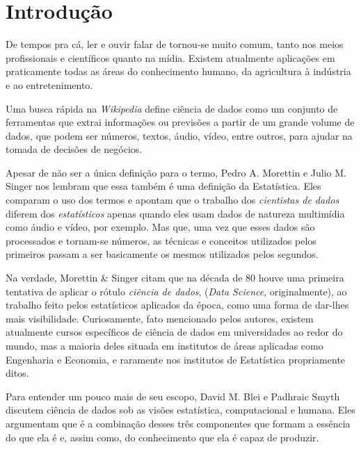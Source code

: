 
\chapter{Introdução}
\label{cap:introducao}


De tempos pra cá, ler e ouvir falar de  tornou-se muito comum, tanto nos meios profissionais e científicos quanto na mídia. Existem atualmente aplicações em praticamente todas as áreas do conhecimento humano, da agricultura à indústria e ao entretenimento.

Uma busca rápida na \emph{Wikipedia} \citep{wiki} define ciência de dados como um conjunto de ferramentas que extrai informações ou previsões a partir de um grande volume de dados, que podem ser números, textos, áudio, vídeo, entre outros, para ajudar na tomada de decisões de negócios.

Apesar de não ser a única definição para o termo, Pedro A. Morettin e Julio M. Singer \citep{apostila} nos lembram que essa também é uma definição da Estatística. Eles comparam o uso dos termos e apontam que o trabalho dos \emph{cientistas de dados} diferem dos \emph{estatísticos} apenas quando eles usam dados de natureza multimídia como áudio e vídeo, por exemplo. Mas que, uma vez que esses dados são processados e tornam-se números, as técnicas e conceitos utilizados pelos primeiros passam a ser basicamente os mesmos utilizados pelos segundos.

Na verdade, Morettin \& Singer \citep{apostila} citam que na década de 80 houve uma primeira tentativa de aplicar o rótulo \emph{ciência de dados}, (\emph{Data Science}, originalmente), ao trabalho feito pelos estatísticos aplicados da época, como uma forma de dar-lhes mais visibilidade. Curiosamente, fato mencionado pelos autores, existem atualmente cursos específicos de ciência de dados em universidades ao redor do mundo, mas a maioria deles situada em institutos de áreas aplicadas como Engenharia e Economia, e raramente nos institutos de Estatística propriamente ditos.

Para entender um pouco mais de seu escopo, David M. Blei e Padhraic Smyth \citep{blei} discutem ciência de dados sob as visões estatística, computacional e humana. Eles argumentam que é a combinação desses três componentes que formam a essência do que ela é e, assim como, do conhecimento que ela é capaz de produzir.

